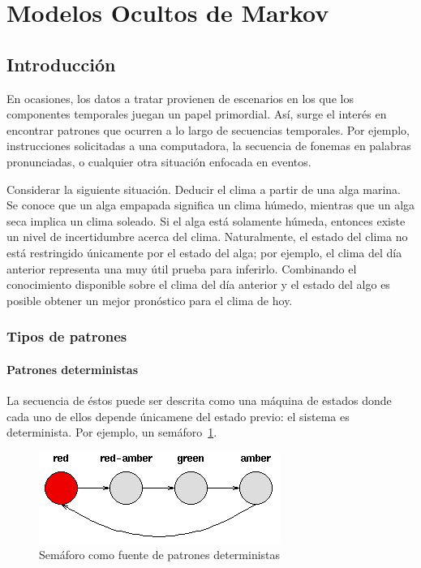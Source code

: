 \documentclass{article}
\begin{document}
\section{Modelos Ocultos de Markov}
\label{sec:modelos_ocultos_de_markov_hidden_markov_models}


\subsection{Introducción}
\label{sub:introducción}
En ocasiones, los datos a tratar provienen de escenarios en los que los componentes temporales juegan un papel primordial.
Así, surge el interés en encontrar patrones que ocurren a lo largo de secuencias temporales.
Por ejemplo, instrucciones solicitadas a una computadora, la secuencia de fonemas en palabras pronunciadas, o cualquier otra situación enfocada en eventos.

Considerar la siguiente situación.
Deducir el clima a partir de una alga marina.
Se conoce que un alga empapada significa un clima húmedo, mientras que un alga seca implica un clima soleado.
Si el alga está solamente húmeda, entonces existe un nivel de incertidumbre acerca del clima.
Naturalmente, el estado del clima no está restringido únicamente por el estado del alga; por ejemplo, el clima del día anterior representa una muy útil prueba para inferirlo.
Combinando el conocimiento disponible sobre el clima del día anterior y el estado del algo es posible obtener un mejor pronóstico para el clima de hoy.

\subsubsection*{Tipos de patrones}
\label{ssub:tipos_de_patrones}

\paragraph{Patrones deterministas} 
\label{par:patrones_determinísticos}
La secuencia de éstos puede ser descrita como una máquina de estados donde cada uno de ellos depende únicamene del estado previo: el sistema es determinista.
Por ejemplo, un semáforo~\ref{fig:semaforo}.

\begin{figure}[]
	\centering
	\includegraphics[]{resources/images/traffic-lights}
	\caption{Semáforo como fuente de patrones deterministas}
	\label{fig:semaforo}
\end{figure}
\end{document}
